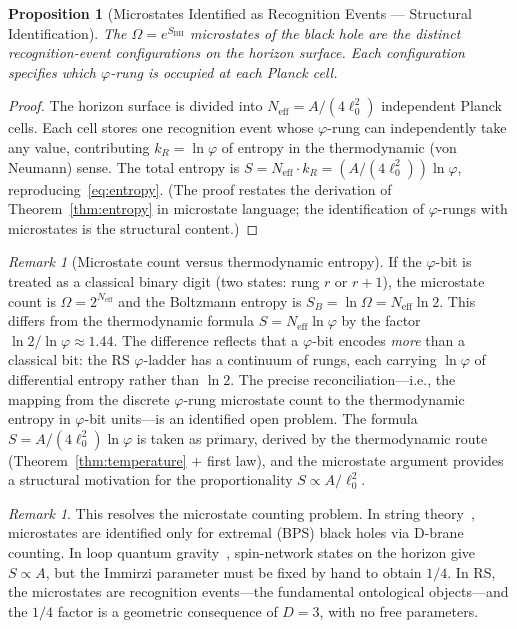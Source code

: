 \documentclass[12pt,a4paper]{article}
\newtheorem{proposition}[theorem]{Proposition}
\theoremstyle{definition}
\theoremstyle{remark}
\newtheorem{remark}[theorem]{Remark}
\begin{document}
\begin{proposition}[Microstates Identified as Recognition Events --- Structural Identification]
\label{thm:microstates}
The $\Omega = e^{S_{\mathrm{BH}}}$ microstates of the black
hole are the distinct recognition-event configurations on the
horizon surface.  Each configuration specifies which
$\varphi$-rung is occupied at each Planck cell.
\end{proposition}

\begin{proof}
The horizon surface is divided into $N_{\mathrm{eff}} =
A/(4\ell_0^2)$ independent Planck cells.  Each cell stores
one recognition event whose $\varphi$-rung can independently
take any value, contributing $k_R = \ln\varphi$ of entropy
in the thermodynamic (von Neumann) sense.  The total entropy is
$S = N_{\mathrm{eff}} \cdot k_R = (A/(4\ell_0^2))\ln\varphi$,
reproducing~\eqref{eq:entropy}.  (The proof restates the derivation
of Theorem~\ref{thm:entropy} in microstate language; the identification
of $\varphi$-rungs with microstates is the structural content.)
\end{proof}

\begin{remark}[Microstate count versus thermodynamic entropy]
\label{rem:microstate-units}
If the $\varphi$-bit is treated as a classical binary digit
(two states: rung $r$ or $r+1$), the microstate count is
$\Omega = 2^{N_{\mathrm{eff}}}$ and the Boltzmann entropy is
$S_B = \ln\Omega = N_{\mathrm{eff}}\ln 2$.  This differs from
the thermodynamic formula $S = N_{\mathrm{eff}}\ln\varphi$ by the
factor $\ln 2/\ln\varphi \approx 1.44$.  The difference reflects
that a $\varphi$-bit encodes \emph{more} than a classical bit: the
RS $\varphi$-ladder has a continuum of rungs, each carrying
$\ln\varphi$ of differential entropy rather than $\ln 2$.  The
precise reconciliation---i.e., the mapping from the discrete
$\varphi$-rung microstate count to the thermodynamic entropy
in $\varphi$-bit units---is an identified open problem.  The
formula $S = A/(4\ell_0^2)\ln\varphi$ is taken as primary,
derived by the thermodynamic route (Theorem~\ref{thm:temperature}
$+$ first law), and the microstate argument provides a structural
motivation for the proportionality $S \propto A/\ell_0^2$.
\end{remark}

\begin{remark}
This resolves the microstate counting problem.  In string
theory~\cite{Strominger1996}, microstates are identified
only for extremal (BPS) black holes via D-brane counting.
In loop quantum gravity~\cite{Rovelli1996}, spin-network
states on the horizon give $S \propto A$, but the Immirzi
parameter must be fixed by hand to obtain $1/4$.  In RS,
the microstates are recognition events---the fundamental
ontological objects---and the $1/4$ factor is a geometric
consequence of $D = 3$, with no free parameters.
\end{remark}
\end{document}
